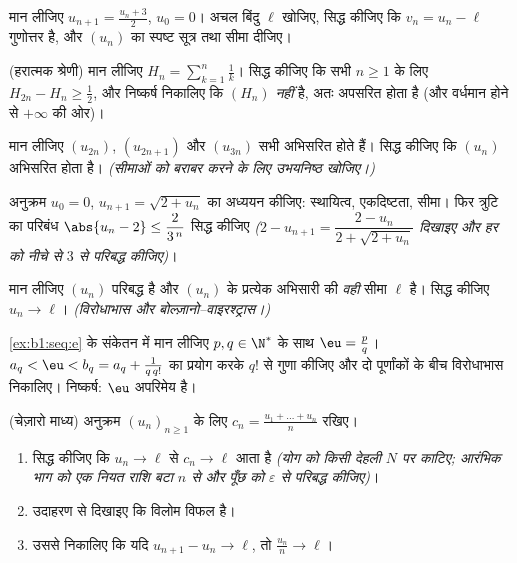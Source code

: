 \begin{exercise}[$\star$]\label{exo:b1:seq:4}
मान लीजिए $u_{n+1} = \frac{u_n + 3}{2}$, $u_0 = 0$। अचल बिंदु $\ell$ खोजिए,
सिद्ध कीजिए कि $v_n = u_n - \ell$ गुणोत्तर है, और $(u_n)$ का स्पष्ट सूत्र
तथा सीमा दीजिए।
\end{exercise}

\begin{exercise}[$\star\star$]\label{exo:b1:seq:5}
(हरात्मक श्रेणी) मान लीजिए $H_n = \sum_{k=1}^{n} \frac 1k$। सिद्ध कीजिए कि
सभी $n \geq 1$ के लिए $H_{2n} - H_n \geq \frac12$, और निष्कर्ष निकालिए कि
$(H_n)$  \emph{नहीं} है, अतः अपसरित होता है (और वर्धमान होने से
$+\infty$ की ओर)।
\end{exercise}

\begin{exercise}[$\star\star$]\label{exo:b1:seq:6}
मान लीजिए $(u_{2n})$, $(u_{2n+1})$ और $(u_{3n})$ सभी अभिसरित होते हैं। सिद्ध
कीजिए कि $(u_n)$ अभिसरित होता है। \emph{(सीमाओं को बराबर करने के लिए
उभयनिष्ठ  खोजिए।)}
\end{exercise}

\begin{exercise}[$\star\star$]\label{exo:b1:seq:7}
अनुक्रम $u_0 = 0$, $u_{n+1} = \sqrt{2 + u_n}$ का अध्ययन कीजिए: स्थायित्व,
एकदिष्टता, सीमा। फिर त्रुटि का परिबंध $\abs{u_n - 2} \leq
\dfrac{2}{3^{\,n}}$ सिद्ध कीजिए \emph{($2 - u_{n+1} = \dfrac{2 - u_n}{2 +
\sqrt{2 + u_n}}$ दिखाइए और हर को नीचे से $3$ से परिबद्ध कीजिए)}।
\end{exercise}

\begin{exercise}[$\star\star$]\label{exo:b1:seq:8}
मान लीजिए $(u_n)$ परिबद्ध है और $(u_n)$ के प्रत्येक अभिसारी  की
\emph{वही} सीमा $\ell$ है। सिद्ध कीजिए $u_n \to \ell$। \emph{(विरोधाभास और
बोल्ज़ानो--वाइरश्ट्रास।)}
\end{exercise}

\begin{exercise}[$\star\star\star$]\label{exo:b1:seq:9}
\cref{ex:b1:seq:e} के संकेतन में मान लीजिए $p, q \in \N^*$ के साथ $\eu =
\frac pq$। $a_q < \eu < b_q = a_q + \frac{1}{q\, q!}$ का प्रयोग करके $q!$ से
गुणा कीजिए और दो पूर्णांकों के बीच विरोधाभास निकालिए। निष्कर्ष: $\eu$
अपरिमेय है।
\end{exercise}

\begin{exercise}[$\star\star\star$]\label{exo:b1:seq:10}
(चेज़ारो माध्य) अनुक्रम $(u_n)_{n \geq 1}$ के लिए $c_n = \frac{u_1 + \dots +
u_n}{n}$ रखिए।
\begin{enumerate}
  \item सिद्ध कीजिए कि $u_n \to \ell$ से $c_n \to \ell$ आता है \emph{(योग को
  किसी देहली $N$ पर काटिए; आरंभिक भाग को एक नियत राशि बटा $n$ से और पूँछ को
  $\varepsilon$ से परिबद्ध कीजिए)}।
  \item उदाहरण से दिखाइए कि विलोम विफल है।
  \item उससे निकालिए कि यदि $u_{n+1} - u_n \to \ell$, तो $\frac{u_n}{n} \to
  \ell$।
\end{enumerate}
\end{exercise}

